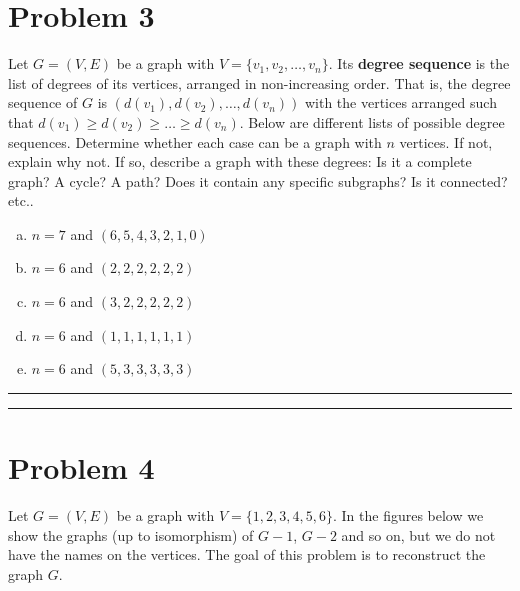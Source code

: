 \documentclass{article}
\theoremstyle{definition}
\newenvironment{solution}{\bigskip\hrule{\hfill}}{\bigskip\hrule{\hfill}} %
\begin{document}

\newpage


\section*{Problem 3}
Let $G=(V, E)$ be a graph with $V=\{v_1, v_2, \dots, v_n\}$. Its \textbf{degree sequence} is the list of degrees of its vertices, arranged in non-increasing order. That is, the degree sequence of $G$ is $(d(v_1), d(v_2), \dots, d(v_n))$ with the vertices arranged such that $d(v_1)\geq  d(v_2) \geq \dots \geq d(v_n)$. Below are different lists of possible degree sequences. Determine whether each case can be a graph with $n$ vertices. If not, explain why not. If so, describe a graph with these degrees: Is it a complete graph? A cycle? A path? Does it contain any specific subgraphs? Is it connected? etc..
	\begin{enumerate}[a)] %
		\item $n=7$ and $(6, 5, 4, 3, 2, 1, 0)$
		\item $n=6$ and $(2, 2, 2, 2, 2, 2)$
		\item $n=6$ and $(3, 2, 2, 2, 2, 2)$
		\item $n=6$ and $(1, 1, 1, 1, 1, 1)$
		\item $n=6$ and $(5, 3, 3, 3, 3, 3)$
    \end{enumerate}
\begin{solution}


\end{solution}


\newpage


\section*{Problem 4}
Let $G=\left(V,E\right)$ be a graph with $V=\{1,2,3,4,5,6\}$. In the figures below we show the graphs (up to isomorphism) of $G-1$, $G-2$ and so on, but we do not have the names on the vertices. The goal of this problem is to reconstruct the graph $G$.
\end{document}
